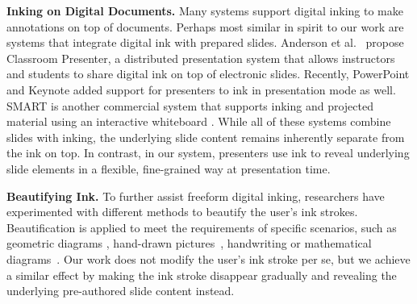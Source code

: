 \textbf{Inking on Digital Documents.} Many systems \cite{yoon2014richreview, marshall1999collaborating, hardock1993marking} support digital inking to make annotations on top of documents. Perhaps most similar in spirit to our work are systems that integrate digital ink with prepared slides. Anderson et al.~\cite{anderson2007classroom} propose Classroom Presenter, a distributed presentation system that allows instructors and students to share digital ink on top of electronic slides. Recently, PowerPoint and Keynote added support for presenters to ink in presentation mode as well. SMART is another commercial system that supports inking and projected material using an interactive whiteboard \cite{smarttech2017}. While all of these systems combine slides with inking, the underlying slide content remains inherently separate from the ink on top. In contrast, in our system, presenters use ink to reveal underlying slide elements in a flexible, fine-grained way at presentation time.

\textbf{Beautifying Ink.} To further assist freeform digital inking, researchers have experimented with different methods to beautify the user's ink strokes. Beautification is applied to meet the requirements of specific scenarios, such as geometric diagrams \cite{igarashi1998pegasus, hse2005recognition, fivser2015shipshape}, hand-drawn pictures~\cite{xie2014portraitsketch, limpaecher2013}, handwriting \cite{zitnick2013handwriting} or mathematical diagrams~\cite{laviola2007mathpad}. Our work does not modify the user's ink stroke per se, but we achieve a similar effect by making the ink stroke disappear gradually and revealing the underlying pre-authored slide content instead.
